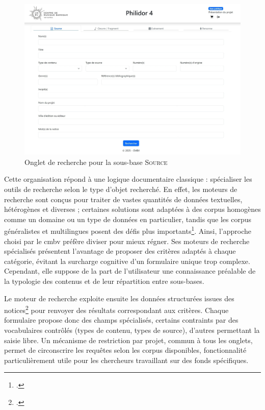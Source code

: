 \begin{figure}[h]
	\caption{Onglet de recherche pour la sous-base \textsc{Source}} \label{source-onglet}
	\centering
	\includegraphics[width=\textwidth]{images/Capture_ecran_onglet_sources_philidor4.jpeg}
\end{figure}

Cette organisation répond à une logique documentaire classique : spécialiser les outils de recherche selon le type d'objet recherché. En effet, les moteurs de recherche sont conçus pour traiter de vastes quantités de données textuelles, hétérogènes et diverses ; certaines solutions sont adaptées à des corpus homogènes comme un domaine ou un type de données en particulier, tandis que les corpus généralistes et multilingues posent des défis plus importants\footcite{bermesMoteursRecherche2007}. Ainsi, l'approche choisi par le \gls{cmbv} préfère diviser pour mieux régner. Ses moteurs de recherche spécialisés présentent l'avantage de proposer des critères adaptés à chaque catégorie, évitant la surcharge cognitive d'un formulaire unique trop complexe. Cependant, elle suppose de la part de l'utilisateur une connaissance préalable de la typologie des contenus et de leur répartition entre sous-bases.

Le moteur de recherche exploite ensuite les données structurées issues des notices\footcite{bermesMoteursRecherche2007} pour renvoyer des résultats correspondant aux critères. Chaque formulaire propose donc des champs spécialisés, certains contraints par des vocabulaires contrôlés (types de contenu, types de source), d'autres permettant la saisie libre. Un mécanisme de restriction par projet, commun à tous les onglets, permet de circonscrire les requêtes selon les corpus disponibles, fonctionnalité particulièrement utile pour les chercheurs travaillant sur des fonds spécifiques.

